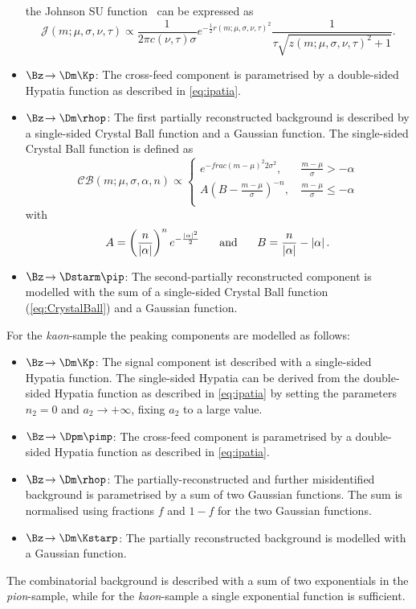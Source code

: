 \begin{itemize}
	the Johnson SU function~\cite{JohnsonSU} can be expressed as
	\begin{equation}
	\mathcal{J}\!\left(m;\mu,\sigma,\nu,\tau\right)\propto\frac{1}{2\pi c(\nu,\tau)\sigma}e^{-\frac{1}{2}r(m;\mu,\sigma,\nu,\tau)^2}\frac{1}{\tau\sqrt{z(m;\mu,\sigma,\nu,\tau)^2+1}}.\label{eq:johnsonsu}
	\end{equation}
	\item $\Bz\!\to\Dm\Kp$: The cross-feed component is parametrised by a double-sided Hypatia function as described in \cref{eq:ipatia}.
	\item $\Bz\!\to\Dm\rhop$: The first partially reconstructed background is described by a single-sided Crystal Ball function and a Gaussian function.
	The single-sided Crystal Ball function is defined as
	\begin{equation}
	\mathcal{C\!B}\!\left(m;\mu,\sigma,\alpha,n\right)\propto\begin{cases}
	e^{-frac{(m-\mu)^2}{2\sigma^2}}, &\, \frac{m-\mu}{\sigma}>-\alpha\\
	A\left(B-\frac{m-\mu}{\sigma}\right)^{-n}, &\, \frac{m-\mu}{\sigma}\leq-\alpha\\\end{cases}\label{eq:CrystalBall}
	\end{equation}
	with
	\begin{equation}
	A=\left(\frac{n}{\left|\alpha\right|}\right)^{n}e^{-\frac{\left|\alpha\right|^2}{2}}\hspace{0.5cm}\text{ and }\hspace{0.5cm}B=\frac{n}{\left|\alpha\right|}-\left|\alpha\right|.
	\end{equation}
	\item $\Bz\!\to\Dstarm\pip$: The second-partially reconstructed component is modelled with the sum of a single-sided Crystal Ball function (\cref{eq:CrystalBall}) and a Gaussian function.
\end{itemize}
For the \emph{kaon}-sample the peaking components are modelled as follows:
\begin{itemize}
	\item $\Bz\!\to\Dm\Kp$: The signal component ist described with a single-sided Hypatia function. The single-sided Hypatia can be derived from the double-sided Hypatia function as described in \cref{eq:ipatia} by setting the parameters $n_2=0$ and $a_2\to+\infty$, \ie fixing $a_2$ to a large value.
	\item $\Bz\!\to\Dpm\pimp$: The cross-feed component is parametrised by a double-sided Hypatia function as described in \cref{eq:ipatia}.
	\item $\Bz\!\to\Dm\rhop$: The partially-reconstructed and further misidentified background is parametrised by a sum of two Gaussian functions. The sum is normalised using fractions $f$ and $1-f$ for the two Gaussian functions.
	\item $\Bz\!\to\Dm\Kstarp$: The partially reconstructed background is modelled with a Gaussian function.
\end{itemize}
The combinatorial background is described with a sum of two exponentials in the \emph{pion}-sample, while for the \emph{kaon}-sample a single exponential function is sufficient.

